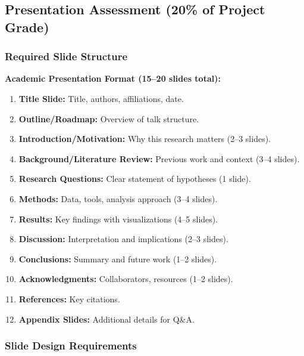 \documentclass[10pt,letterpaper]{article}
\begin{document}
\subsection{Presentation Assessment (20\% of Project Grade)}

\subsubsection{Required Slide Structure}

\begin{bluebox}
\textbf{Academic Presentation Format (15--20 slides total):}
\begin{enumerate}
  \item \textbf{Title Slide:} Title, authors, affiliations, date.
  \item \textbf{Outline/Roadmap:} Overview of talk structure.
  \item \textbf{Introduction/Motivation:} Why this research matters (2--3 slides).
  \item \textbf{Background/Literature Review:} Previous work and context (3--4 slides).
  \item \textbf{Research Questions:} Clear statement of hypotheses (1 slide).
  \item \textbf{Methods:} Data, tools, analysis approach (3--4 slides).
  \item \textbf{Results:} Key findings with visualizations (4--5 slides).
  \item \textbf{Discussion:} Interpretation and implications (2--3 slides).
  \item \textbf{Conclusions:} Summary and future work (1--2 slides).
  \item \textbf{Acknowledgments:} Collaborators, resources (1--2 slides).
  \item \textbf{References:} Key citations.
  \item \textbf{Appendix Slides:} Additional details for Q\&A.
\end{enumerate}
\end{bluebox}

\subsubsection{Slide Design Requirements}
\end{document}
